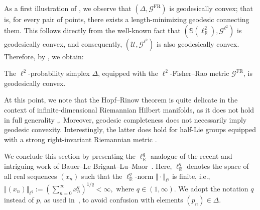 \documentclass[runningheads]{llncs}
\def\RR{\mathbb{R}}
\def\Slr{\mathbb{S}\left(\ell_{\RR}^2 \right)}
\def\U{\mathcal{U}}
\def\Glt{\mathcal{G}^{\ell^2}}
\def\Gfr{\mathcal{G}^{\mathrm{FR}}}
\begin{document}
As a first illustration of , we observe that $(\Delta, \Gfr)$ is geodesically convex; that is, for every pair of points, there exists a length-minimizing geodesic connecting them. This follows directly from the well-known fact that $(\Slr, \Glt)$ is geodesically convex, and consequently, $(\U, \Glt)$ is also geodesically convex.  
Therefore, by , we obtain:
\begin{corollary}
	The $\ell^2$-probability simplex $\Delta$, equipped with the $\ell^2$-Fisher–Rao metric $\Gfr$, is geodesically convex. 
\end{corollary}
\begin{remark}
	At this point, we note that the Hopf–Rinow theorem is quite delicate in the context of infinite-dimensional Riemannian Hilbert manifolds, as it does not hold in full generality \cite{HopfrinowfalseAktkin},\cite{HopfrinowfalseEkeland}.  
	Moreover, geodesic completeness does not necessarily imply geodesic convexity. Interestingly, the latter does hold for half-Lie groups equipped with a strong right-invariant Riemannian metric \cite{Bauer_2025}.
\end{remark}
We conclude this section by presenting the $\ell^q_{\RR}$-analogue of the recent and intriguing work of Bauer–Le Brigant–Lu–Maor~\cite{bauerLpFisherRaoMetricAmari2024}. Here, $\ell^q_{\RR}$ denotes the space of all real sequences $(x_n)$ such that the $\ell^q_{\RR}$-norm $\Vert \cdot \Vert_{\ell^q}$ is finite, i.e.,
$\Vert (x_n) \Vert_{\ell^q} := \left( \sum_{n=0}^{\infty} x_n^q \right)^{1/q} < \infty,
$ where $q \in (1, \infty)$. We adopt the notation $q$ instead of $p$, as used in~\cite{bauerLpFisherRaoMetricAmari2024}, to avoid confusion with elements $(p_n) \in \Delta$. 
\end{document}
